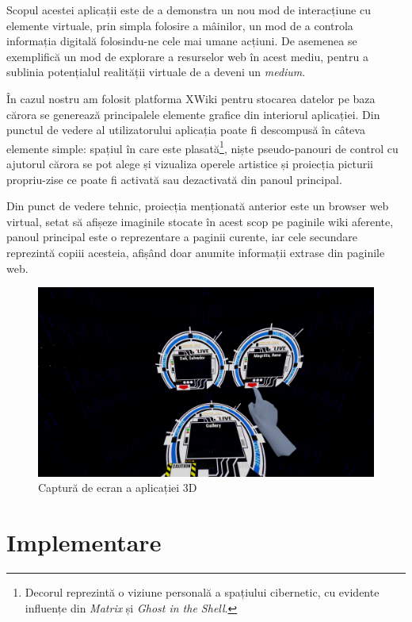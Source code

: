 Scopul acestei aplicații este de a demonstra un nou mod de interacțiune cu elemente virtuale, prin simpla folosire a mâinilor, un mod de a controla informația digitală folosindu-ne cele mai umane acțiuni.
De asemenea se exemplifică un mod de explorare a resurselor web în acest mediu, pentru a sublinia potențialul realității virtuale de a deveni un \textit{medium}.

În cazul nostru am folosit platforma XWiki pentru stocarea datelor pe baza cărora se generează principalele elemente grafice din interiorul aplicației.
Din punctul de vedere al utilizatorului aplicația poate fi descompusă în câteva elemente simple: spațiul în care este plasată\footnote{Decorul reprezintă o viziune personală a spațiului cibernetic, cu evidente influențe din \textit{Matrix} și \textit{Ghost in the Shell}.}, niște pseudo-panouri de control cu ajutorul cărora se pot alege și vizualiza operele artistice și proiecția picturii propriu-zise ce poate fi activată sau dezactivată din panoul principal.

Din punct de vedere tehnic, proiecția menționată anterior este un browser web virtual, setat să afișeze imaginile stocate în acest scop pe paginile wiki aferente, panoul principal este o reprezentare a paginii curente, iar cele secundare reprezintă copiii acesteia, afișând doar anumite informații extrase din paginile web.

\begin{figure}[h]
  \centering
  \includegraphics[scale=0.28]{img/screenshot1.png}
  \caption{Captură de ecran a aplicației 3D}
\end{figure}


\section{Implementare}

